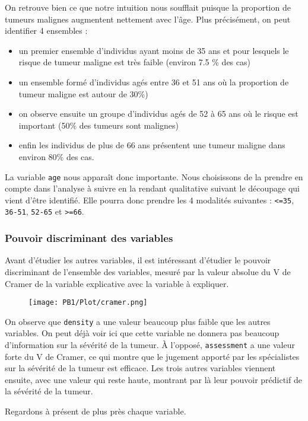 \documentclass[a4paper]{report}
\begin{document}
On retrouve bien ce que notre intuition nous soufflait puisque la proportion de tumeurs malignes augmentent nettement avec l'âge. Plus précisément, on peut identifier 4 ensembles :
\begin{itemize}
\item un premier ensemble d'individus ayant moins de 35 ans et pour lesquels le risque de tumeur maligne est très faible (environ 7.5 \% des cas)
\item un ensemble formé d'individus agés entre 36 et 51 ans où la proportion de tumeur maligne est autour de 30\%)
\item on observe ensuite un groupe d'individus agés de 52 à 65 ans où le risque est important (50\% des tumeurs sont malignes)
\item enfin les individus de plus de 66 ans présentent une tumeur maligne dans environ 80\% des cas.
\end{itemize} 

La variable \verb|age| nous apparaît donc importante. Nous choisissons de la prendre en compte dans l'analyse à suivre en la rendant qualitative suivant le découpage qui vient d'être identifié. Elle pourra donc prendre les 4 modalités suivantes : \verb|<=35|, \verb|36-51|, \verb|52-65| et \verb|>=66|.


\subsubsection{Pouvoir discriminant des variables}
Avant d'étudier les autres variables, il est intéressant d'étudier le pouvoir discriminant de l'ensemble des variables, mesuré par la valeur absolue du V de Cramer de la variable explicative avec la variable à expliquer. 

\begin{figure}[!ht]
	\centering
     	\texttt{[image: PB1/Plot/cramer.png]} 
\end{figure}

On observe que \verb|density| a une valeur beaucoup plus faible que les autres variables. On peut déjà voir ici que cette variable ne donnera pas beaucoup d'information sur la sévérité de la tumeur. À l'opposé, \verb|assessment| a une valeur forte du V de Cramer, ce qui montre que le jugement apporté par les spécialistes sur la sévérité de la tumeur est efficace. Les trois autres variables viennent ensuite, avec une valeur qui reste haute, montrant par là leur pouvoir prédictif de la sévérité de la tumeur. 

Regardons à présent de plus près chaque variable.
\end{document}
